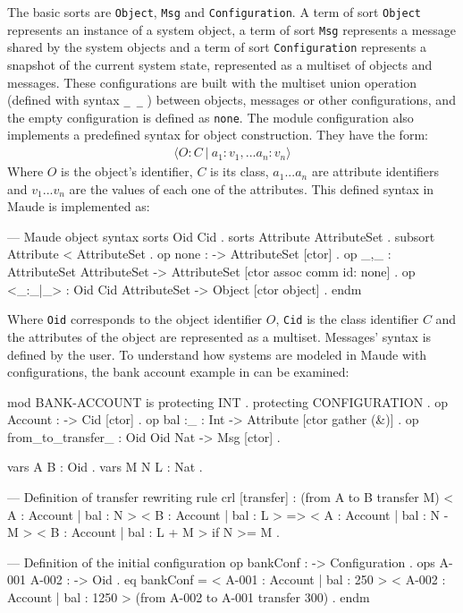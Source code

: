 The basic sorts are \texttt{Object}, \texttt{Msg} and \texttt{Configuration}. A term of sort \texttt{Object} represents an instance of a system object, a term of sort \texttt{Msg} represents a message shared by the system objects and a term of sort \texttt{Configuration} represents a snapshot of the current system state, represented as a multiset of objects and messages. These configurations are built with the multiset union operation (defined with syntax \texttt{\_\,\_} ) between objects, messages or other configurations, and the empty configuration is defined as \texttt{none}. The module configuration also implements a predefined syntax for object construction. They have the form:
\begin{align*}
    \langle O : C \ | \ a_1:v_1,...a_n:v_n \rangle
\end{align*}
Where $O$ is the object's identifier, $C$ is its class, $a_1...a_n$ are attribute identifiers and $v_1...v_n$ are the values of each one of the attributes. This defined syntax in Maude is implemented as:
\\
\begin{maude}
  --- Maude object syntax
  sorts Oid Cid .
  sorts Attribute AttributeSet .
  subsort Attribute < AttributeSet .
  op none : -> AttributeSet [ctor] .
  op _,_ : AttributeSet AttributeSet -> AttributeSet
  [ctor assoc comm id: none] .
  op <_:_|_> : Oid Cid AttributeSet -> Object [ctor object] .
endm
\end{maude}
Where \texttt{Oid} corresponds to the object identifier $O$, \texttt{Cid} is the class identifier $C$ and the attributes of the object are represented as a multiset. Messages' syntax is defined by the user. To understand how systems are modeled in Maude with configurations, the bank account example in \cite{MaudeManual} can be examined:
\\
\begin{maude}
mod BANK-ACCOUNT is
    protecting INT .
    protecting CONFIGURATION .
    op Account : -> Cid [ctor] .
    op bal :_ : Int -> Attribute [ctor gather (&)] .
    op from_to_transfer_ : Oid Oid Nat -> Msg [ctor] .
    
    vars A B : Oid .
    vars M N L : Nat .

    --- Definition of transfer rewriting rule
    crl [transfer] :
      (from A to B transfer M)
      < A : Account | bal : N >
      < B : Account | bal : L >
      => < A : Account | bal : N - M >
         < B : Account | bal : L + M >
      if N >= M .

    --- Definition of the initial configuration
    op bankConf : -> Configuration .
    ops A-001 A-002 : -> Oid .
    eq bankConf
    = < A-001 : Account | bal : 250 >
      < A-002 : Account | bal : 1250 >
      (from A-002 to A-001 transfer 300) .
endm
\end{maude}
